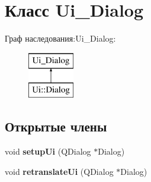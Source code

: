 \hypertarget{class_ui___dialog}{\section{Класс \-Ui\-\_\-\-Dialog}
\label{class_ui___dialog}
}
Граф наследования\-:\-Ui\-\_\-\-Dialog\-:\begin{figure}[H]
\begin{center}
\leavevmode
\includegraphics[height=2.000000cm]{class_ui___dialog}
\end{center}
\end{figure}
\subsection*{Открытые члены}
\begin{DoxyCompactItemize}
\item 
\hypertarget{class_ui___dialog_a4f6a478c3ecdafabffb17b39cb26444a}{void {\bfseries setup\-Ui} (\-Q\-Dialog $\ast$\-Dialog)}\label{class_ui___dialog_a4f6a478c3ecdafabffb17b39cb26444a}

\item 
\hypertarget{class_ui___dialog_afa0ccb6f716ca6178260522a193c250e}{void {\bfseries retranslate\-Ui} (\-Q\-Dialog $\ast$\-Dialog)}\label{class_ui___dialog_afa0ccb6f716ca6178260522a193c250e}

\end{DoxyCompactItemize}
